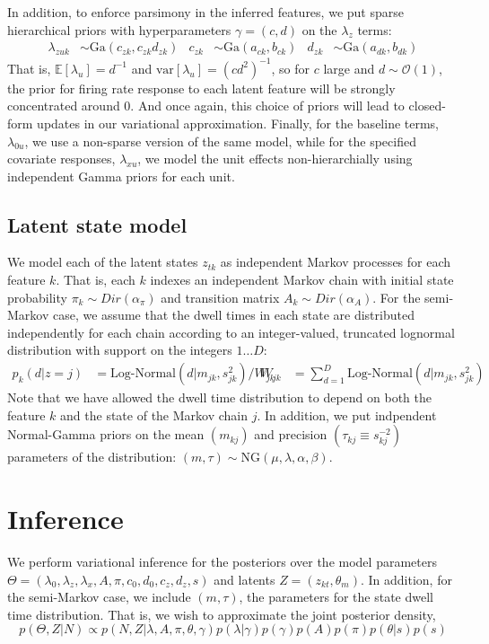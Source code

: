\documentclass{article} %
\begin{document}
In addition, to enforce parsimony in the inferred features, we put sparse hierarchical priors with hyperparameters $\gamma = (c, d)$ on the $\lambda_z$ terms:
\begin{align}
    \label{hierarchy}
    \lambda_{zuk} &\sim \text{Ga}(c_{zk}, c_{zk} d_{zk}) & c_{zk} &\sim \text{Ga}(a_{ck}, b_{ck})
    & d_{zk} &\sim \text{Ga}(a_{dk}, b_{dk})
\end{align}
That is, $\mathbb{E}[\lambda_u] = d^{-1}$ and $\text{var}[\lambda_u] = (cd^2)^{-1}$, so for $c$ large and $d\sim \mathcal{O}(1)$, the prior for firing rate response to each latent feature will be strongly concentrated around 0. And once again, this choice of priors will lead to closed-form updates in our variational approximation. Finally, for the baseline terms, $\lambda_{0u}$, we use a non-sparse version of the same model, while for the specified covariate responses, $\lambda_{xu}$, we model the unit effects non-hierarchially using independent Gamma priors for each unit.

\subsection{Latent state model}
We model each of the latent states $z_{tk}$ as independent Markov processes for each feature $k$. That is, each $k$ indexes an independent Markov chain with initial state probability $\pi_k\sim Dir(\alpha_\pi)$ and transition matrix $A_k\sim Dir(\alpha_A)$. For the semi-Markov case, we assume that the dwell times in each state are distributed independently for each chain according to an integer-valued, truncated lognormal distribution with support on the integers $1\dots D$:
\begin{align}
    \label{semi-markov}
    p_k(d|z = j) &= \text{Log-Normal}(d|m_{jk}, s^2_{jk}) / W_{jk}  &
    W_{jk} &= \sum_{d = 1}^D \text{Log-Normal}(d|m_{jk}, s^2_{jk}) 
\end{align}
Note that we have allowed the dwell time distribution to depend on both the feature $k$ and the state of the Markov chain $j$. In addition, we put indpendent Normal-Gamma priors on the mean $(m_{kj})$ and precision $(\tau_{kj} \equiv s_{kj}^{-2})$ parameters of the distribution: $(m, \tau) \sim \text{NG}(\mu, \lambda, \alpha, \beta)$.

\section{Inference}

We perform variational inference for the posteriors over the model parameters $\Theta = (\lambda_0, \lambda_z, \lambda_x, A, \pi, c_0, d_0, c_z, d_z, s)$ and latents $Z=(z_{kt},\theta_m)$. In addition, for the semi-Markov case, we include $(m, \tau)$, the parameters for the state dwell time distribution. That is, we wish to approximate the joint posterior density, 
\begin{equation}
    p(\Theta,Z|N) \propto p(N, Z |\lambda, A, \pi, \theta, \gamma) 
    p(\lambda|\gamma) p(\gamma)
    p(A)p(\pi)p(\theta|s)p(s)
\end{equation}
\end{document}
